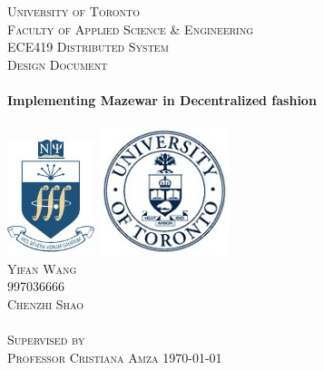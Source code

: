 \begin{titlepage}
\begin{center}

\textsc{\LARGE University of Toronto}
\\[1.5cm]
\textsc{\large Faculty of Applied Science \& Engineering}
\\[0.5cm]
\textsc{\large ECE419 Distributed System}
\\[1.5cm]
\textsc{\Large Design Document}
\\[1.5cm]
\HRule
\\[0.5cm]
{ \huge \bfseries Implementing Mazewar in Decentralized fashion}
\\[0.3cm]
\HRule
\\[1.0cm]

\includegraphics[width=1.0in]{./Logos/nscilogo}
\hspace{2cm}
\includegraphics[width=1.5in]{./Logos/utorontologo}
\\[1.0cm]

\textsc{\large Yifan Wang}
\\[0.25cm]
\textsc{\normalsize 997036666}
\\[0.25cm]
\textsc{\large Chenzhi Shao}
\\[0.25cm]
\textsc{\normalsize }
\\[1.0cm]
\textsc{Supervised by}
\\[0.25cm]
\textsc{\large Professor Cristiana Amza}
\vfill
{\large \today}

\end{center}
\end{titlepage} 
